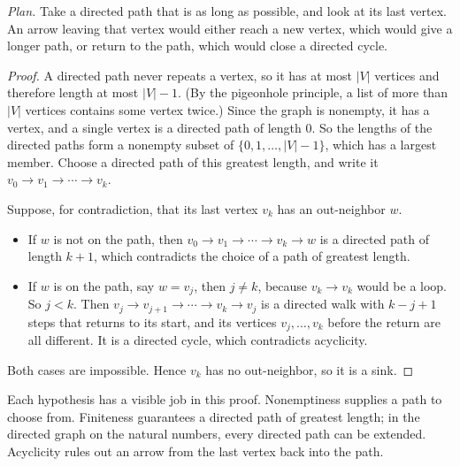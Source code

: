 \noindent\textit{Plan.} Take a directed path that is as long as possible, and look at its last vertex. An arrow leaving that vertex would either reach a new vertex, which would give a longer path, or return to the path, which would close a directed cycle.
\begin{proof}
A directed path never repeats a vertex, so it has at most $|V|$ vertices and therefore length at most $|V|-1$. (By the pigeonhole principle, a list of more than $|V|$ vertices contains some vertex twice.) Since the graph is nonempty, it has a vertex, and a single vertex is a directed path of length $0$. So the lengths of the directed paths form a nonempty subset of $\{0,1,\ldots,|V|-1\}$, which has a largest member. Choose a directed path of this greatest length, and write it $v_0\to v_1\to\cdots\to v_k$.

Suppose, for contradiction, that its last vertex $v_k$ has an out-neighbor $w$.
\begin{itemize}
\item If $w$ is not on the path, then $v_0\to v_1\to\cdots\to v_k\to w$ is a directed path of length $k+1$, which contradicts the choice of a path of greatest length.
\item If $w$ is on the path, say $w=v_j$, then $j\ne k$, because $v_k\to v_k$ would be a loop. So $j<k$. Then $v_j\to v_{j+1}\to\cdots\to v_k\to v_j$ is a directed walk with $k-j+1$ steps that returns to its start, and its vertices $v_j,\ldots,v_k$ before the return are all different. It is a directed cycle, which contradicts acyclicity.
\end{itemize}
Both cases are impossible. Hence $v_k$ has no out-neighbor, so it is a sink.
\end{proof}

Each hypothesis has a visible job in this proof. Nonemptiness supplies a path to choose from. Finiteness guarantees a directed path of greatest length; in the directed graph on the natural numbers, every directed path can be extended. Acyclicity rules out an arrow from the last vertex back into the path.

